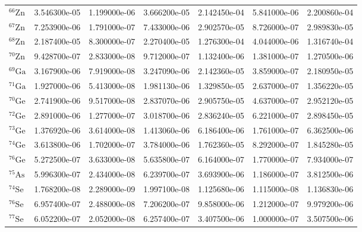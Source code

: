 \begin{tabular}{lrrrrrr}
$^{66}\mathrm{Zn}$  &       3.546300e-05 &      1.199000e-06 &      3.666200e-05 &       2.142450e-04 &      5.841000e-06 &      2.200860e-04 \\
$^{67}\mathrm{Zn}$  &       7.253900e-06 &      1.791000e-07 &      7.433000e-06 &       2.902570e-05 &      8.726000e-07 &      2.989830e-05 \\
$^{68}\mathrm{Zn}$  &       2.187400e-05 &      8.300000e-07 &      2.270400e-05 &       1.276300e-04 &      4.044000e-06 &      1.316740e-04 \\
$^{70}\mathrm{Zn}$  &       9.428700e-07 &      2.833000e-08 &      9.712000e-07 &       1.132400e-06 &      1.381000e-07 &      1.270500e-06 \\
$^{69}\mathrm{Ga}$  &       3.167900e-06 &      7.919000e-08 &      3.247090e-06 &       2.142360e-05 &      3.859000e-07 &      2.180950e-05 \\
$^{71}\mathrm{Ga}$  &       1.927000e-06 &      5.413000e-08 &      1.981130e-06 &       1.329850e-05 &      2.637000e-07 &      1.356220e-05 \\
$^{70}\mathrm{Ge}$  &       2.741900e-06 &      9.517000e-08 &      2.837070e-06 &       2.905750e-05 &      4.637000e-07 &      2.952120e-05 \\
$^{72}\mathrm{Ge}$  &       2.891000e-06 &      1.277000e-07 &      3.018700e-06 &       2.836240e-05 &      6.221000e-07 &      2.898450e-05 \\
$^{73}\mathrm{Ge}$  &       1.376920e-06 &      3.614000e-08 &      1.413060e-06 &       6.186400e-06 &      1.761000e-07 &      6.362500e-06 \\
$^{74}\mathrm{Ge}$  &       3.613800e-06 &      1.702000e-07 &      3.784000e-06 &       1.762360e-05 &      8.292000e-07 &      1.845280e-05 \\
$^{76}\mathrm{Ge}$  &       5.272500e-07 &      3.633000e-08 &      5.635800e-07 &       6.164000e-07 &      1.770000e-07 &      7.934000e-07 \\
$^{75}\mathrm{As}$  &       5.996300e-07 &      2.434000e-08 &      6.239700e-07 &       3.693900e-06 &      1.186000e-07 &      3.812500e-06 \\
$^{74}\mathrm{Se}$  &       1.768200e-08 &      2.289000e-09 &      1.997100e-08 &       1.125680e-06 &      1.115000e-08 &      1.136830e-06 \\
$^{76}\mathrm{Se}$  &       6.957400e-07 &      2.488000e-08 &      7.206200e-07 &       9.858000e-06 &      1.212000e-07 &      9.979200e-06 \\
$^{77}\mathrm{Se}$  &       6.052200e-07 &      2.052000e-08 &      6.257400e-07 &       3.407500e-06 &      1.000000e-07 &      3.507500e-06 \\

\end{tabular}
